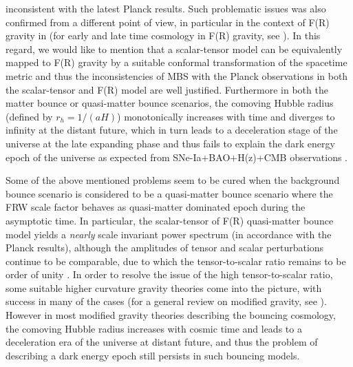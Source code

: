 \documentclass{article}
\begin{document}
inconsistent with the latest Planck results. Such problematic issues was also confirmed from a different point of view, in particular in the context of 
F(R) gravity in \cite{Odintsov:2014gea,Nojiri:2019lqw} (for early and late time cosmology in F(R) gravity, see \cite{Nojiri:2017ncd,Nojiri:2010wj,
Elizalde:2018rmz}). In this regard, we would like to mention that a scalar-tensor model can be equivalently 
mapped to F(R) gravity by a suitable conformal transformation 
of the spacetime metric and thus the inconsistencies of MBS with the Planck observations in both the scalar-tensor and F(R) model 
are well justified. Furthermore in both the matter bounce or quasi-matter bounce scenarios, the comoving Hubble radius 
(defined by $r_h = 1/\left(aH\right)$) monotonically increases with time and diverges to 
infinity at the distant future, which in turn leads to a deceleration stage of the universe at the late expanding phase and thus 
fails to explain the dark energy epoch of the universe as expected from SNe-Ia+BAO+H(z)+CMB observations 
\cite{Perlmutter:1996ds,Perlmutter:1998np,Riess:1998cb}. 

Some of the above mentioned problems seem to be cured when the background bounce scenario is considered to be a 
quasi-matter bounce scenario where the FRW scale factor behaves as quasi-matter dominated epoch during the asymptotic time. 
In particular, the scalar-tensor of F(R) quasi-matter bounce model yields a \emph{nearly} 
scale invariant power spectrum (in accordance with the Planck results), although the amplitudes of tensor and scalar perturbations 
continue to be comparable, due to which the tensor-to-scalar ratio remains to be order of unity \cite{deHaro:2015wda}. In order to resolve the 
issue of the high tensor-to-scalar ratio, some suitable higher curvature gravity theories come into the picture, with success in many of the 
cases \cite{Nojiri:2019lqw,Elizalde:2020zcb} (for a general review on modified gravity, see \cite{Nojiri:2017ncd,Nojiri:2010wj,Capozziello:2011et,
Capozziello:2010zz}). 
However in most modified gravity theories describing the bouncing cosmology, the comoving Hubble radius increases with 
cosmic time and leads to a deceleration era of the universe at distant future, and thus the problem of describing a dark energy epoch 
still persists in such bouncing models.
\end{document}
